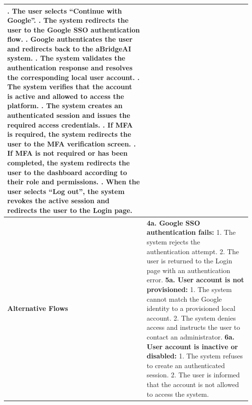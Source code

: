\begin{longtable}{|>{\raggedright\arraybackslash}p{}|>{\raggedright\arraybackslash}p{}|}
2. The user selects ``Continue with Google''. \newline
3. The system redirects the user to the Google SSO authentication flow. \newline
4. Google authenticates the user and redirects back to the aBridgeAI system. \newline
5. The system validates the authentication response and resolves the corresponding local user account. \newline
6. The system verifies that the account is active and allowed to access the platform. \newline
7. The system creates an authenticated session and issues the required access credentials. \newline
8. If MFA is required, the system redirects the user to the MFA verification screen. \newline
9. If MFA is not required or has been completed, the system redirects the user to the dashboard according to their role and permissions. \newline
10. When the user selects ``Log out'', the system revokes the active session and redirects the user to the Login page. \\ \hline
\textbf{Alternative Flows} &
\textbf{4a. Google SSO authentication fails:} \newline
\hspace*{1em}1. The system rejects the authentication attempt. \newline
\hspace*{1em}2. The user is returned to the Login page with an authentication error. \newline
\textbf{5a. User account is not provisioned:} \newline
\hspace*{1em}1. The system cannot match the Google identity to a provisioned local account. \newline
\hspace*{1em}2. The system denies access and instructs the user to contact an administrator. \newline
\textbf{6a. User account is inactive or disabled:} \newline
\hspace*{1em}1. The system refuses to create an authenticated session. \newline
\hspace*{1em}2. The user is informed that the account is not allowed to access the system. \newline

\end{longtable}
